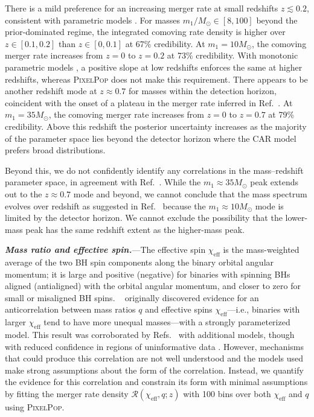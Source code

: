 \documentclass[%
 reprint,
 amsmath,amssymb,
 aps,
 prl,
 nofootinbib,nobibnotes,
]{revtex4-2}
\newcommand{\heading}[1]{\textbf{\textit{#1.}}}
\begin{document}
There is a mild preference for an increasing merger rate at small redshifts $z \lesssim 0.2$, consistent with parametric models \cite{Fishbach:2018edt, Callister:2020arv, KAGRA:2021duu, Schiebelbein-Zwack:2024roj}. For masses $m_1 / M_\odot \in [8,100]$ beyond the prior-dominated regime, the integrated comoving rate density is higher over $z \in [0.1,0.2]$ than $z \in [0,0.1]$ at 67\% credibility. At $m_1 = 10M_\odot$, the comoving merger rate increases from $z=0$ to $z=0.2$ at 73\% credibility. With monotonic parametric models \cite{KAGRA:2021duu, Fishbach:2018edt}, a positive slope at low redshifts enforces the same at higher redshifts, whereas \textsc{PixelPop} does not make this requirement. There appears to be another redshift mode at $z\approx0.7$ for masses within the detection horizon, coincident with the onset of a plateau in the merger rate inferred in Ref.~\cite{Callister:2023tgi}. At $m_1 = 35M_\odot$, the comoving merger rate increases from $z=0$ to $z=0.7$ at 79\% credibility. Above this redshift the posterior uncertainty increases as the majority of the parameter space lies beyond the detector horizon where the CAR model prefers broad distributions.

Beyond this, we do not confidently identify any correlations in the mass--redshift parameter space, in agreement with Ref.~\cite{Ray:2023upk,Sadiq:2021fin}. While the $m_1 \approx 35 M_\odot$ peak extends out to the $z \approx 0.7$ mode and beyond, we cannot conclude that the mass spectrum evolves over redshift as suggested in Ref.~\cite{Rinaldi:2023bbd} because the $m_1 \approx 10 M_\odot$ mode is limited by the detector horizon. We cannot exclude the possibility that the lower-mass peak has the same redshift extent as the higher-mass peak.

\heading{Mass ratio and effective spin}---The effective spin $\chi_\mathrm{eff}$ is the mass-weighted average of the two BH spin components along the binary orbital angular momentum; it is large and positive (negative) for binaries with spinning BHs aligned (antialigned) with the orbital angular momentum, and closer to zero for small or misaligned BH spins. \citeauthor{Callister:2021fpo}~\cite{Callister:2021fpo} originally discovered evidence for an anticorrelation between mass ratios $q$ and effective spins $\chi_\mathrm{eff}$---i.e., binaries with larger $\chi_\mathrm{eff}$ tend to have more unequal masses---with a strongly parameterized model. This result was corroborated by Refs.~\cite{Adamcewicz:2022hce, Adamcewicz:2023mov, Heinzel:2023hlb, KAGRA:2021duu} with additional models, though with reduced confidence in regions of uninformative data \cite{Heinzel:2023hlb}. However, mechanisms that could produce this correlation are not well understood \cite{Broekgaarden:2022nst, Bavera:2020uch, Zevin:2022wrw, Gerosa:2021mno, McKernan:2021nwk, Santini:2023ukl, Baibhav:2022qxm, Santini:2023ukl, Olejak:2021iux, Olejak:2024qxr} and the models used make strong assumptions about the form of the correlation. Instead, we quantify the evidence for this correlation and constrain its form with minimal assumptions by fitting the merger rate density $\mathcal{R}(\chi_\mathrm{eff},q;z)$ with 100 bins over both $\chi_\mathrm{eff}$ and $q$ using \textsc{PixelPop}.
\end{document}
